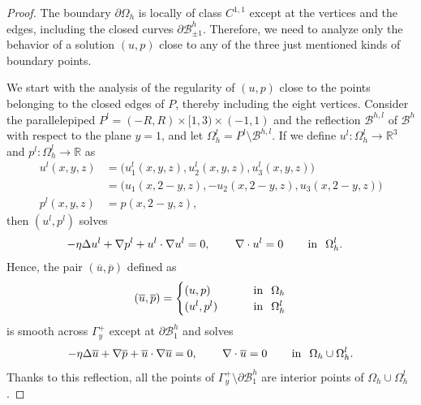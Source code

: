 \documentclass[11pt,a4paper]{amsart}
\theoremstyle{remark}
\theoremstyle{definition}
\numberwithin{equation}{section}
\numberwithin{proposition}{section}
\begin{document}
\begin{proof}
The boundary $\partial\Omega_h$ is locally of class $C^{1,1}$ except at the vertices and the edges, including the closed curves $\partial \mathcal{B}_{\pm 1}^h$. Therefore, we need
to analyze only the behavior of a solution $(u,p)$ close to any of the three just mentioned kinds of boundary points.\par
We start with the analysis of the regularity of $(u,p)$ close to the points belonging to the closed edges of $P$, thereby including the eight
vertices.
Consider the parallelepiped $P^l=(-R,R)\times[1,3)\times(-1,1)$ and the reflection $\mathcal{B}^{h,l}$ of $\mathcal{B}^h$ with respect to the
plane $y=1$, and let $\Omega_h^l=P^l\setminus\mathcal{B}^{h,l}$. If we define $u^l:\Omega_h^l\to\mathbb{R}^3$ and $p^l:\Omega_h^l\to\mathbb{R}$ as
\begin{align*}
u^l(x,y,z)&=\big(u^l_1(x,y,z),u^l_2(x,y,z),u^l_3(x,y,z)\big)\\
&=\big(u_1(x,2-y,z),-u_2(x,2-y,z),u_3(x,2-y,z)\big)\\
p^l(x,y,z)&=p(x,2-y,z),
\end{align*}
then $(u^l,p^l)$ solves
\begin{align*}
-\eta\Delta u^l+\nabla p^l+u^l\cdot\nabla u^l=0,\hspace{.3in}\nabla\cdot u^l=0&\hspace{.3in}\mbox{in}\hspace{.1in}\Omega_h^l.
\end{align*}
Hence, the pair $(\overline{u},\overline{p})$ defined as
\begin{equation*}
(\overline{u},\overline{p})=
\begin{cases}
(u,p)&\hspace{.3in}\mbox{in}\hspace{.1in}\Omega_h\\
(u^l,p^l)&\hspace{.3in}\mbox{in}\hspace{.1in}\Omega_h^l
\end{cases}
\end{equation*}
is smooth across $\Gamma^+_y$ except at $\partial\mathcal{B}^h_1$ and solves
\begin{equation*}
-\eta\Delta\overline{u}+\nabla\overline{p}+\overline{u}\cdot\nabla\overline{u}=0,\hspace{.3in}\nabla\cdot\overline{u}=0\hspace{.3in}
\mbox{in}\hspace{.1in}\Omega_h\cup\Omega_h^l.
\end{equation*}
Thanks to this reflection, all the points of $\Gamma^+_y\setminus\partial\mathcal{B}^h_1$ are interior points of $\Omega_h\cup\Omega_h^l$.

\end{proof}
\end{document}
